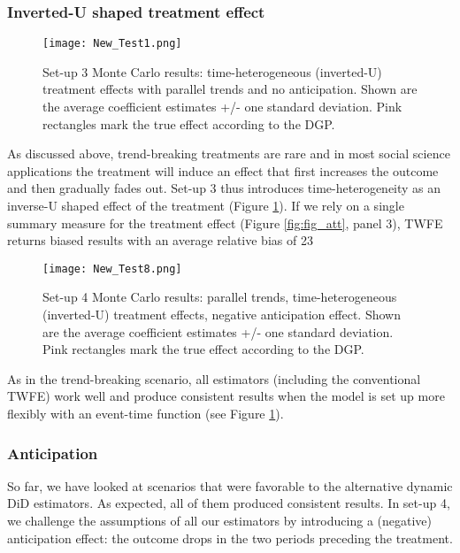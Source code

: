 \subsubsection{Inverted-U shaped treatment effect}


\begin{figure}[t]    \centering
    \texttt{[image: New\_Test1.png]}
    \caption{Set-up 3 Monte Carlo results: time-heterogeneous (inverted-U) treatment effects with parallel trends and no anticipation. Shown are the average coefficient estimates +/- one standard deviation. Pink rectangles mark the true effect according to the DGP.}    \label{fig:fig3}     \hypertarget{fig:fig3}{} \end{figure}

As discussed above, trend-breaking treatments are rare and in most social science applications the treatment will induce an effect that first increases the outcome and then gradually fades out. Set-up 3 thus introduces time-heterogeneity as an inverse-U shaped effect of the treatment (Figure \ref{fig:fig3}). If we rely on a single summary measure for the treatment effect (Figure \ref{fig:fig_att}, panel 3), TWFE returns biased results with an average relative bias of 23\
\begin{figure}[t]    \centering
    \texttt{[image: New\_Test8.png]}
    \caption{Set-up 4 Monte Carlo results: parallel trends, time-heterogeneous (inverted-U) treatment effects, negative anticipation effect. Shown are the average coefficient estimates +/- one standard deviation. Pink rectangles mark the true effect according to the DGP.}    \label{fig:fig4}    \hypertarget{fig:fig4}{}\end{figure}

As in the trend-breaking scenario, all estimators (including the conventional TWFE) work well and produce consistent results when the model is set up more flexibly with an event-time function (see Figure \ref{fig:fig3}). 


\subsubsection{Anticipation}

So far, we have looked at scenarios that were favorable to the alternative dynamic DiD estimators. As expected, all of them produced consistent results. In set-up 4, we challenge the assumptions of all our estimators by introducing a (negative) anticipation effect: the outcome drops in the two periods preceding the treatment. 

